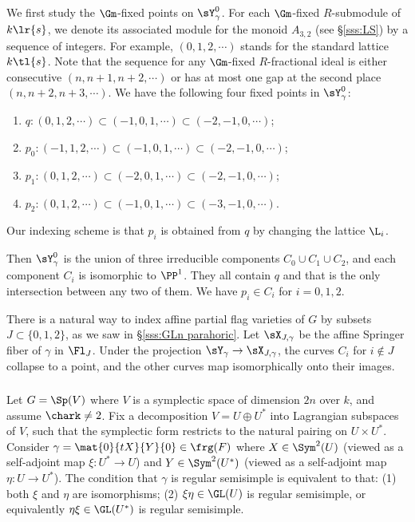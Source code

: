 We first study the $\Gm$-fixed points on $\sY^{0}_{\gamma}$. For each $\Gm$-fixed $R$-submodule of $k\lr{s}$, we denote its associated module for the monoid $A_{3,2}$ (see \S\ref{sss:LS}) by a sequence of integers. For example, $(0,1,2,\cdots)$ stands for the standard lattice $k\tl{s}$. Note that the sequence for any $\Gm$-fixed $R$-fractional ideal is either consecutive $(n,n+1,n+2,\cdots)$ or has at most one gap at the second place $(n,n+2,n+3,\cdots)$. We have the following four fixed points in $\sY^{0}_{\gamma}$:
\begin{enumerate}
\item $q: (0,1,2,\cdots)\subset (-1,0,1,\cdots)\subset (-2,-1,0,\cdots)$;
\item $p_{0}: (-1,1,2,\cdots)\subset (-1,0,1,\cdots)\subset (-2,-1,0,\cdots)$;
\item $p_{1}: (0,1,2,\cdots)\subset (-2,0,1,\cdots)\subset (-2,-1,0,\cdots)$;
\item $p_{2}:(0,1,2,\cdots)\subset (-1,0,1,\cdots)\subset (-3,-1,0,\cdots)$. 
\end{enumerate}
Our indexing scheme is that $p_{i}$ is obtained from $q$ by changing the lattice $\L_{i}$. 

Then $\sY^{0}_{\gamma}$ is the union of three irreducible components $C_{0}\cup C_{1}\cup C_{2}$, and each component $C_{i}$ is isomorphic to $\PP^{1}$. They all contain $q$ and that is the only intersection between any two of them. We have $p_{i}\in C_{i}$ for $i=0,1,2$.

There is a natural way to index affine partial flag varieties  of $G$ by subsets $J\subset \{0,1,2\}$, as we saw in \S\ref{sss:GLn parahoric}. Let $\sX_{J,\gamma}$ be the affine Springer fiber of $\gamma$ in $\Fl_{J}$. Under the projection $\sY_{\gamma}\to \sX_{J,\gamma}$, the curves $C_{i}$ for $i\notin J$ collapse to a point, and the other curves map isomorphically onto their images.



\subsubsection{}\label{ex:Sp} Let $G=\Sp(V)$ where $V$ is a symplectic space of dimension $2n$ over $k$, and assume $\chark\neq2$. Fix a decomposition $V=U\oplus U^{*}$ into Lagrangian subspaces of $V$, such that the symplectic form restricts to the natural pairing on $U\times U^{*}$. Consider $\gamma=\mat{0}{tX}{Y}{0}\in\frg(F)$ where $X\in\Sym^{2}(U)$ (viewed as a self-adjoint map $\xi:U^{*}\to U$) and $Y\in\Sym^{2}(U^{*})$ (viewed as a self-adjoint map $\eta:U\to U^{*}$). The condition that $\gamma$ is regular semisimple is equivalent to that: (1) both $\xi$ and $\eta$ are isomorphisms; (2) $\xi\eta\in\GL(U)$ is regular semisimple, or equivalently $\eta\xi\in\GL(U^{*})$ is regular semisimple.

